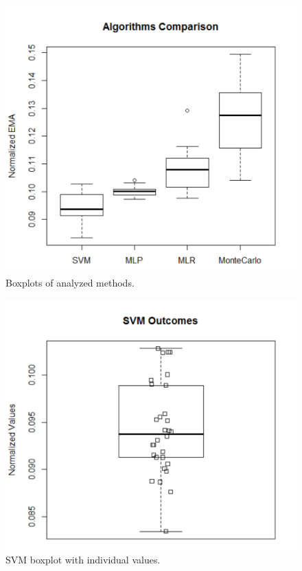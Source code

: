 \documentclass[a4paper,twoside]{article}
\begin{document}
\begin{figure}[!h]
  \vspace{-0.2cm}
  \centering
  \includegraphics[width=\columnwidth]{images/resul_final.pdf}
  \caption{Boxplots of analyzed methods.}
  \label{fig:final_result}
\end{figure}

\begin{figure}[!h]
  \vspace{-0.2cm}
  \centering
  \includegraphics[width=\columnwidth]{images/svm_exclusive.pdf}
  \caption{SVM boxplot with individual values.}
  \label{fig:svm_exclusive}
\end{figure}
\end{document}
